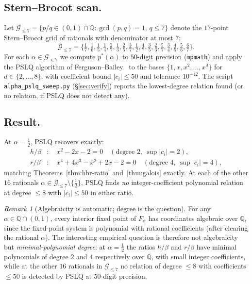 \documentclass[11pt,reqno]{amsart}
\theoremstyle{plain}
\theoremstyle{definition}
\theoremstyle{remark}
\newtheorem*{remark}{Remark}
\newcommand{\Q}{\mathbb{Q}}
\begin{document}
\subsection{Stern--Brocot scan.}
Let $\mathcal{G}_{\le 7} = \{p/q\in(0,1)\cap\Q : \gcd(p, q) = 1,
\, q\le 7\}$ denote the $17$-point Stern--Brocot grid of
rationals with denominator at most $7$:
\[
  \mathcal{G}_{\le 7} = \bigl\{
    \tfrac{1}{7}, \tfrac{1}{6}, \tfrac{1}{5}, \tfrac{1}{4},
    \tfrac{2}{7}, \tfrac{1}{3}, \tfrac{2}{5}, \tfrac{3}{7},
    \tfrac{1}{2}, \tfrac{4}{7}, \tfrac{3}{5}, \tfrac{2}{3},
    \tfrac{5}{7}, \tfrac{3}{4}, \tfrac{4}{5}, \tfrac{5}{6},
    \tfrac{6}{7}
  \bigr\}.
\]
For each $\alpha\in\mathcal{G}_{\le 7}$ we compute
$p^*(\alpha)$ to $50$-digit precision (\texttt{mpmath}) and apply
the PSLQ algorithm of Ferguson--Bailey~\cite{FergusonBailey1999}
to the bases
$\{1, x, x^{2}, \dots, x^{d}\}$ for $d\in\{2, \dots, 8\}$, with
coefficient bound $|c_{i}|\le 50$ and tolerance
$10^{-42}$. The script
\texttt{alpha\_pslq\_sweep.py} (\S\ref{sec:verify}) reports the
lowest-degree relation found (or no relation, if PSLQ does not
detect any).

\subsection{Result.}
At $\alpha = \tfrac12$, PSLQ recovers exactly:
\begin{align*}
  h/\beta &: \quad x^{2} - 2x - 2 = 0 \quad
    (\text{degree }2,\ \sup|c_{i}| = 2),\\
  r/\beta &: \quad x^{4} + 4x^{3} - x^{2} + 2x - 2 = 0 \quad
    (\text{degree }4,\ \sup|c_{i}| = 4),
\end{align*}
matching Theorems~\ref{thm:hbr-ratio} and~\ref{thm:galois}
exactly. At each of the other $16$ rationals
$\alpha\in\mathcal{G}_{\le 7}\setminus\{\tfrac12\}$, PSLQ finds
\emph{no} integer-coefficient polynomial relation at degree
$\le 8$ with $|c_{i}| \le 50$ in either ratio.

\begin{remark}[Algebraicity is automatic; degree is the question]
\label{rem:degree-bounded}
For any $\alpha\in\Q\cap(0, 1)$, every interior fixed point of
$F_{\alpha}$ has coordinates algebraic over $\Q$, since the
fixed-point system is polynomial with rational coefficients
(after clearing the rational $\alpha$). The interesting empirical
question is therefore not algebraicity but \emph{minimal-polynomial
degree}: at $\alpha = \tfrac12$ the ratios $h/\beta$ and $r/\beta$
have minimal polynomials of degree $2$ and $4$ respectively over
$\Q$, with small integer coefficients, while at the other $16$
rationals in $\mathcal{G}_{\le 7}$ no relation of degree $\le 8$
with coefficients $\le 50$ is detected by PSLQ at $50$-digit
precision.
\end{remark}
\end{document}
